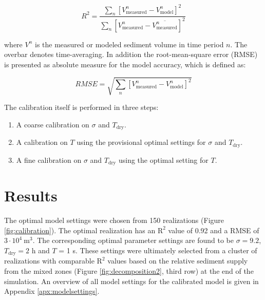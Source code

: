 \begin{equation}
  \label{eq:r2}
  R^2 = \frac{\sum_n \left[ V^n_{\mathrm{measured}} - V^n_{\mathrm{model}} \right]^2}{\sum_n \left[ V^n_{\mathrm{measured}} - \overline{V^n_{\mathrm{measured}}} \right]^2}
\end{equation}

\noindent where $V^n$ is the measured or modeled sediment volume in
time period $n$. The overbar denotes time-averaging. In addition the
root-mean-square error (RMSE) is presented as absolute measure for the
model accuracy, which is defined as:

\begin{equation}
  \label{eq:rmse}
  RMSE = \sqrt{\sum_n \left[ V^n_{\mathrm{measured}} - V^n_{\mathrm{model}} \right]^2}
\end{equation}

\noindent The calibration itself is performed in three steps:

\begin{enumerate}
\item A coarse calibration on $\sigma$ and $T_{\mathrm{dry}}$.
\item A calibration on $T$ using the provisional optimal settings for
  $\sigma$ and $T_{\mathrm{dry}}$.
\item A fine calibration on $\sigma$ and $T_{\mathrm{dry}}$ using the
  optimal setting for $T$.
\end{enumerate}

\section{Results}

The optimal model settings were chosen from 150 realizations (Figure
\ref{fig:calibration}). The optimal realization has an $\mathrm{R^2}$
value of 0.92 and a RMSE of $3 \cdot 10^4 ~ \mathrm{m^3}$.
The corresponding optimal parameter settings are found to be
$\sigma = 9.2$, $T_{\mathrm{dry}} = 2$ h and $T$ = 1 s. These
settings were ultimately selected from a cluster of realizations with
comparable $\mathrm{R^2}$ values based on the relative sediment supply
from the mixed zones (Figure \ref{fig:decomposition2}, third row) at
the end of the simulation. An overview of all model settings for the
calibrated model is given in Appendix \ref{apx:modelsettings}.



